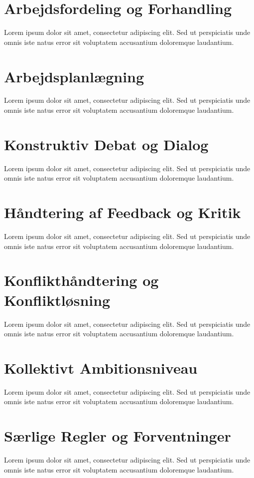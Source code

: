 \documentclass{article}
\begin{document}
\section*{Arbejdsfordeling og Forhandling}
Lorem ipsum dolor sit amet, consectetur adipiscing elit. Sed ut perspiciatis unde omnis iste natus error sit voluptatem accusantium doloremque laudantium.


\section*{Arbejdsplanlægning}
Lorem ipsum dolor sit amet, consectetur adipiscing elit. Sed ut perspiciatis unde omnis iste natus error sit voluptatem accusantium doloremque laudantium.


\section*{Konstruktiv Debat og Dialog}
Lorem ipsum dolor sit amet, consectetur adipiscing elit. Sed ut perspiciatis unde omnis iste natus error sit voluptatem accusantium doloremque laudantium.


\section*{Håndtering af Feedback og Kritik }
Lorem ipsum dolor sit amet, consectetur adipiscing elit. Sed ut perspiciatis unde omnis iste natus error sit voluptatem accusantium doloremque laudantium.



\section*{Konflikthåndtering og Konfliktløsning}
Lorem ipsum dolor sit amet, consectetur adipiscing elit. Sed ut perspiciatis unde omnis iste natus error sit voluptatem accusantium doloremque laudantium.



\section*{Kollektivt Ambitionsniveau}
Lorem ipsum dolor sit amet, consectetur adipiscing elit. Sed ut perspiciatis unde omnis iste natus error sit voluptatem accusantium doloremque laudantium.



\section*{Særlige Regler og Forventninger}
Lorem ipsum dolor sit amet, consectetur adipiscing elit. Sed ut perspiciatis unde omnis iste natus error sit voluptatem accusantium doloremque laudantium.
\end{document}
